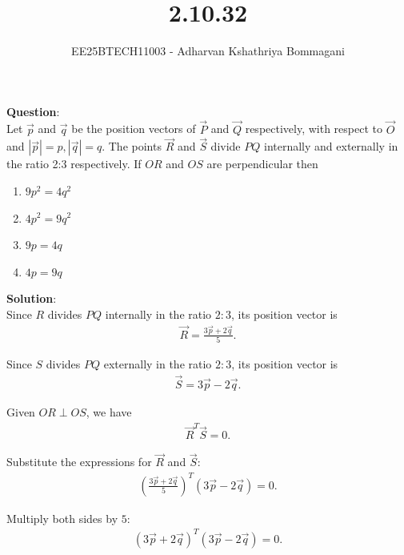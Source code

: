 \documentclass[journal]{IEEEtran}
\begin{document}

\vspace{3cm}

\title{2.10.32}
\author{EE25BTECH11003 - Adharvan Kshathriya Bommagani}
{\newpage\maketitle}

\renewcommand{\thefigure}{\theenumi}
\renewcommand{\thetable}{\theenumi}
\setlength{\intextsep}{10pt}

\textbf{Question}:\\
Let $\vec{p}$ and $\vec{q}$ be the position vectors of $\vec{P}$ and $\vec{Q}$ respectively, with respect to $\vec{O}$ and $|\vec{p}| = p, |\vec{q}| = q$. The points $\vec{R}$ and $\vec{S}$ divide $PQ$ internally and externally in the ratio 2:3 respectively. If $OR$ and $OS$ are perpendicular then
\begin{enumerate}[label=\alph*)]
    \item $9p^2 = 4q^2$
    \item $4p^2 = 9q^2$
    \item $9p = 4q$
    \item $4p = 9q$
\end{enumerate}

\bigskip

\textbf{Solution}:\\

Since $R$ divides $PQ$ internally in the ratio $2:3$, its position vector is
\begin{align*}
\vec{R} = \frac{3\vec{p} + 2\vec{q}}{5}.
\end{align*}

Since $S$ divides $PQ$ externally in the ratio $2:3$, its position vector is
\begin{align*}
\vec{S} = 3\vec{p} - 2\vec{q}.
\end{align*}

Given $OR \perp OS$, we have
\begin{align*}
\vec{R}^T \vec{S} = 0.
\end{align*}

Substitute the expressions for $\vec{R}$ and $\vec{S}$:
\begin{align*}
\left(\frac{3\vec{p} + 2\vec{q}}{5}\right)^T (3\vec{p} - 2\vec{q}) = 0.
\end{align*}

Multiply both sides by $5$:
\begin{align*}
(3\vec{p} + 2\vec{q})^T (3\vec{p} - 2\vec{q}) = 0.
\end{align*}
\end{document}

